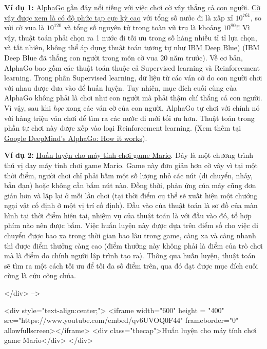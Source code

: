  
\textbf{Ví dụ 1:} \href{https://gogameguru.com/tag/deepmind-alphago-lee-sedol/}{AlphaGo gần đây nổi tiếng với việc chơi cờ vây thắng cả con người}. \href{https://www.tastehit.com/blog/google-deepmind-alphago-how-it-works/}{Cờ vây được xem là có độ phức tạp cực kỳ cao} với tổng số nước đi là xấp xỉ $10^{761} $, so với cờ vua là $10^{120} $ và tổng số nguyên tử trong toàn vũ trụ là khoảng $10^{80}$!! Vì vậy, thuật toán phải chọn ra 1 nước đi tối ưu trong số hàng nhiều tỉ tỉ lựa chọn, và tất nhiên, không thể áp dụng thuật toán tương tự như \href{https://en.wikipedia.org/wiki/Deep_Blue_(chess_computer}{IBM Deep Blue}) (IBM Deep Blue đã thắng con người trong môn cờ vua 20 năm trước). Về cơ bản, AlphaGo bao gồm các thuật toán thuộc cả Supervised learning và Reinforcement learning. Trong phần Supervised learning, dữ liệu từ các ván cờ do con người chơi với nhau được đưa vào để huấn luyện. Tuy nhiên, mục đích cuối cùng của AlphaGo không phải là chơi như con người mà phải thậm chí thắng cả con người. Vì vậy, sau khi \textit{học} xong các ván cờ của con người, AlphaGo tự chơi với chính nó với hàng triệu ván chơi để tìm ra các nước đi mới tối ưu hơn. Thuật toán trong phần tự chơi này được xếp vào loại Reinforcement learning. (Xem thêm tại \href{https://www.tastehit.com/blog/google-deepmind-alphago-how-it-works/}{Google DeepMind's AlphaGo: How it works}). 
 
 
\textbf{Ví dụ 2:} \href{https://www.youtube.com/watch?v=qv6UVOQ0F44}{Huấn luyện cho máy tính chơi game Mario}. Đây là một chương trình thú vị dạy máy tính chơi game Mario. Game này đơn giản hơn cờ vây vì tại một thời điểm, người chơi chỉ phải bấm một số lượng nhỏ các nút (di chuyển, nhảy, bắn đạn) hoặc không cần bấm nút nào. Đồng thời, phản ứng của máy cũng đơn giản hơn và lặp lại ở mỗi lần chơi (tại thời điểm cụ thể sẽ xuất hiện một chướng ngại vật cố định ở một vị trí cố định). Đầu vào của thuật toán là sơ đồ của màn hình tại thời điểm hiện tại, nhiệm vụ của thuật toán là với đầu vào đó, tổ hợp phím nào nên được bấm. Việc huấn luyện này được dựa trên điểm số cho việc di chuyển được bao xa trong thời gian bao lâu trong game, càng xa và càng nhanh thì được điểm thưởng càng cao (điểm thưởng này không phải là điểm của trò chơi mà là điểm do chính người lập trình tạo ra). Thông qua huấn luyện, thuật toán sẽ tìm ra một cách tối ưu để tối đa số điểm trên, qua đó đạt được mục đích cuối cùng là cứu công chúa. 
 
 
</div> --> 
 
<div style="text-align:center;"> 
<iframe width="600" height = "400" src="https://www.youtube.com/embed/qv6UVOQ0F44" frameborder="0" allowfullscreen></iframe> 
<div class="thecap">Huấn luyện cho máy tính chơi game Mario</div> 
</div> 
 
